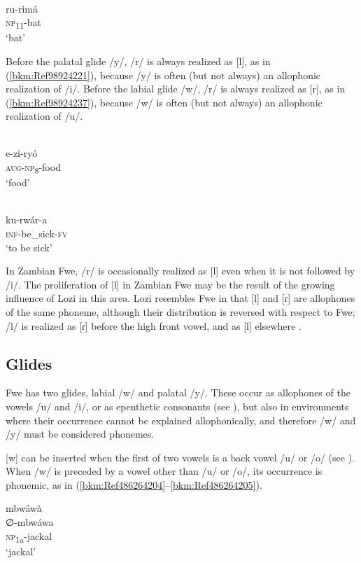 \ea
\glll [rùlímà]\\
ru-rimá\\
\textsc{np}\textsubscript{11}-bat\\
\glt ‘bat’
\z

Before the palatal glide /y/, /r/ is always realized as [l], as in (\ref{bkm:Ref98924221}), because /y/ is often (but not always) an allophonic realization of /i/. Before the labial glide /w/, /r/ is always realized as [r], as in (\ref{bkm:Ref98924237}), because /w/ is often (but not always) an allophonic realization of /u/.

\ea
\label{bkm:Ref98924221}
\glll [èzílyò]\\
e-zi-ryó\\
\textsc{aug}-\textsc{np}\textsubscript{8}-food\\
\glt ‘food’
\z

\ea
\label{bkm:Ref98924237}
\glll [kùrwârà]\\
ku-rwár-a\\
\textsc{inf}-be\_sick-\textsc{fv}\\
\glt ‘to be sick’
\z

In Zambian Fwe, /r/ is occasionally realized as [l] even when it is not followed by /i/. The proliferation of [l] in Zambian Fwe may be the result of the growing influence of Lozi in this area. Lozi resembles Fwe in that [l] and [ɾ] are allophones of the same phoneme, a\-l\-though their distribution is reversed with respect to Fwe; /l/ is realized as [ɾ] before the high front vowel, and as [l] elsewhere \citep[129]{Gowlett1989}.

\subsection{Glides}

Fwe has two glides, labial /w/ and palatal /y/. These occur as allophones of the vowels /u/ and /i/, or as epenthetic consonants (see ), but also in envi\-ronments where their occurrence cannot be explained allophonically, and therefore /w/ and /y/ must be considered phonemes.

[w] can be in\-serted when the first of two vowels is a back vowel /u/ or /o/ (see ). When /w/ is pre\-ceded by a vowel other than /u/ or /o/, its occurrence is phonemic, as in (\ref{bkm:Ref486264204}--\ref{bkm:Ref486264205}).

\ea
\label{bkm:Ref486264204}
\glll mbwâwà\\
∅-mbwáwa\\
\textsc{np}\textsubscript{1a}-jackal\\
\glt ‘jackal’
\z

